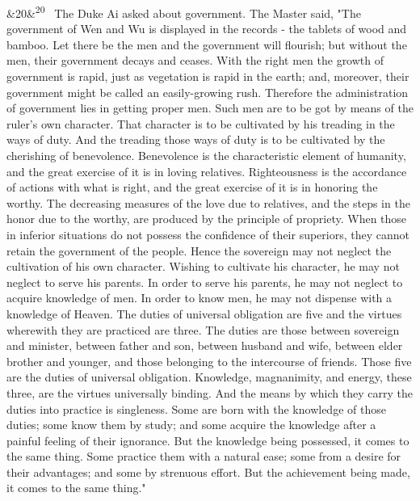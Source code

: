 \documentclass[12pt]{article}
\newcommand{\para}[1][]{\par\noindent\ifx&#1&\else\textsuperscript{\footnotesize #1}~\fi}
\begin{document}
\para[20] The Duke Ai asked about government. The Master said, "The government of Wen and Wu is displayed in the records - the tablets of wood and bamboo. Let there be the men and the government will flourish; but without the men, their government decays and ceases. With the right men the growth of government is rapid, just as vegetation is rapid in the earth; and, moreover, their government might be called an easily-growing rush. Therefore the administration of government lies in getting proper men. Such men are to be got by means of the ruler's own character. That character is to be cultivated by his treading in the ways of duty. And the treading those ways of duty is to be cultivated by the cherishing of benevolence. Benevolence is the characteristic element of humanity, and the great exercise of it is in loving relatives. Righteousness is the accordance of actions with what is right, and the great exercise of it is in honoring the worthy. The decreasing measures of the love due to relatives, and the steps in the honor due to the worthy, are produced by the principle of propriety. When those in inferior situations do not possess the confidence of their superiors, they cannot retain the government of the people. Hence the sovereign may not neglect the cultivation of his own character. Wishing to cultivate his character, he may not neglect to serve his parents. In order to serve his parents, he may not neglect to acquire knowledge of men. In order to know men, he may not dispense with a knowledge of Heaven. The duties of universal obligation are five and the virtues wherewith they are practiced are three. The duties are those between sovereign and minister, between father and son, between husband and wife, between elder brother and younger, and those belonging to the intercourse of friends. Those five are the duties of universal obligation. Knowledge, magnanimity, and energy, these three, are the virtues universally binding. And the means by which they carry the duties into practice is singleness. Some are born with the knowledge of those duties; some know them by study; and some acquire the knowledge after a painful feeling of their ignorance. But the knowledge being possessed, it comes to the same thing. Some practice them with a natural ease; some from a desire for their advantages; and some by strenuous effort. But the achievement being made, it comes to the same thing."
\end{document}
